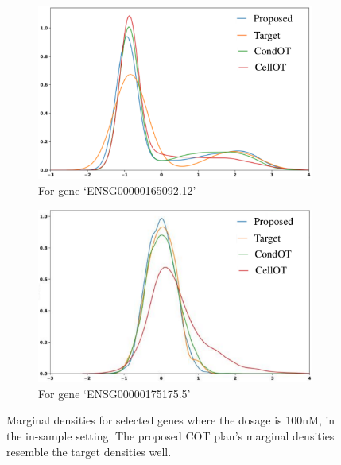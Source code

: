 \begin{figure}[t]
\centering
\begin{subfigure}{.4\textwidth}
    \centering
    \includegraphics[width=\textwidth]{chapter-3/images/C41.pdf}  
    \caption{For gene `ENSG00000165092.12'}
\end{subfigure}
\begin{subfigure}{.4\textwidth}
    \centering
    \includegraphics[width=\linewidth]{chapter-3/images/C42.pdf}  
    \caption{For gene `ENSG00000175175.5'}
    \label{fig:marginal}
\end{subfigure}
\caption{Marginal densities for selected genes where the dosage is 100nM, in the in-sample setting. The proposed COT plan's marginal densities resemble the target densities well.}
\end{figure}


